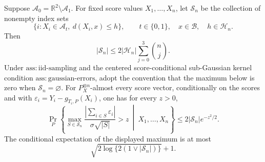 Suppose \(\mathcal A_0=\mathbb R^2\setminus\mathcal A_1\). For fixed score values \(X_1,\ldots,X_n\), let \(\mathscr S_n\) be the collection of nonempty index sets
\[
 \{i:X_i\in\mathcal A_t,\ d(X_i,x)\le h\},
 \qquad t\in\{0,1\},\quad x\in\mathcal B,\quad h\in\mathcal H_n.
\]
Then
\[
 |\mathscr S_n|\le 2|\mathcal H_n|\sum_{j=0}^3\binom nj.
\]
Under \(\mathrm{ass:iid\text{-}sampling}\) and the centered score-conditional sub-Gaussian kernel condition \(\mathrm{ass:gaussian\text{-}errors}\), adopt the convention that the maximum below is zero when \(\mathscr S_n=\varnothing\). For \(P_X^{\otimes n}\)-almost every score vector, conditionally on the scores and with \(\varepsilon_i=Y_i-g_{T_i,P}(X_i)\), one has for every \(z>0\),
\[
 \Pr_P\left\{\max_{S\in\mathscr S_n}
 \frac{|\sum_{i\in S}\varepsilon_i|}{\sigma\sqrt{|S|}}>z
 \ \middle|\ X_1,\ldots,X_n\right\}
 \le 2|\mathscr S_n|e^{-z^2/2}.
\]
The conditional expectation of the displayed maximum is at most
\[
 \sqrt{2\log\{2(1\vee|\mathscr S_n|)\}}+1.
\]